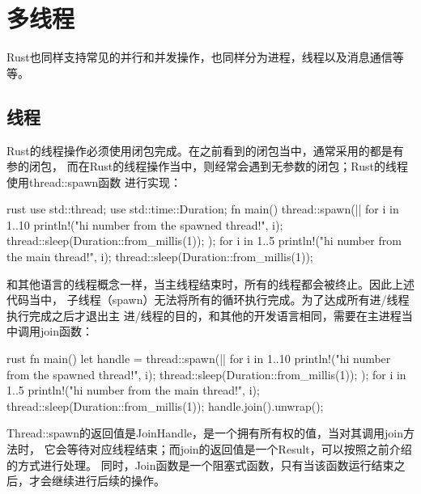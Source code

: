 \section{多线程}
Rust也同样支持常见的并行和并发操作，也同样分为进程，线程以及消息通信等等。

\subsection{线程}
Rust的线程操作必须使用闭包完成。在之前看到的闭包当中，通常采用的都是有参的闭包，
而在Rust的线程操作当中，则经常会遇到无参数的闭包；Rust的线程使用thread::spawn函数
进行实现：
\begin{code-block}{rust}
use std::thread;
use std::time::Duration;
fn main() {
    thread::spawn(|| {
        for i in 1..10 {
            println!("hi number {} from the spawned thread!", i);
            thread::sleep(Duration::from_millis(1));
        }
    });
    for i in 1..5 {
        println!("hi number {} from the main thread!", i);
        thread::sleep(Duration::from_millis(1));
    }
}
\end{code-block}
和其他语言的线程概念一样，当主线程结束时，所有的线程都会被终止。因此上述代码当中，
子线程（spawn）无法将所有的循环执行完成。为了达成所有进/线程执行完成之后才退出主
进/线程的目的，和其他的开发语言相同，需要在主进程当中调用join函数：
\begin{code-block}{rust}
fn main() {
    let handle = thread::spawn(|| {
        for i in 1..10 {
            println!("hi number {} from the spawned thread!", i);
            thread::sleep(Duration::from_millis(1));
        }
    });
    for i in 1..5 {
        println!("hi number {} from the main thread!", i);
        thread::sleep(Duration::from_millis(1));
    }
    handle.join().unwrap();
}
\end{code-block}
Thread::spawn的返回值是JoinHandle，是一个拥有所有权的值，当对其调用join方法时，
它会等待对应线程结束；而join的返回值是一个Result，可以按照之前介绍的方式进行处理。
同时，Join函数是一个阻塞式函数，只有当该函数运行结束之后，才会继续进行后续的操作。


